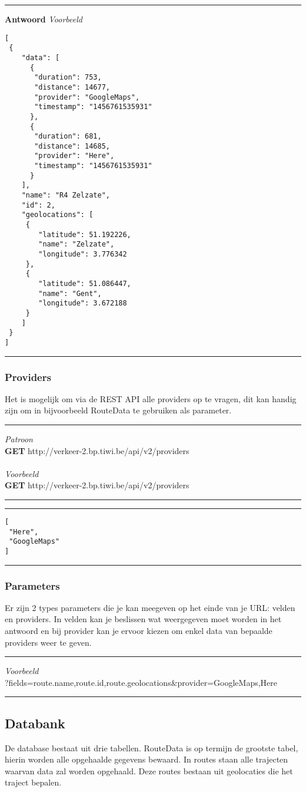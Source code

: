 \documentclass[ps,a4paper,oneside]{report}
\begin{document}
\noindent\rule[0.5ex]{\linewidth}{1pt}
\textbf{Antwoord}
\textit{Voorbeeld}
\begin{verbatim}[
 {
    "data": [
      {
       "duration": 753,
       "distance": 14677,
       "provider": "GoogleMaps",
       "timestamp": "1456761535931"
      },
      {
       "duration": 681,
       "distance": 14685,
       "provider": "Here",
       "timestamp": "1456761535931"
      }
    ],
    "name": "R4 Zelzate",
    "id": 2,
    "geolocations": [
     {
        "latitude": 51.192226,
        "name": "Zelzate",
        "longitude": 3.776342
     },
     {
        "latitude": 51.086447,
        "name": "Gent",
        "longitude": 3.672188
     }
    ]
 }
]\end{verbatim}
\noindent\rule[0.5ex]{\linewidth}{1pt}
\subsubsection{Providers}
Het is mogelijk om via de REST API alle providers op te vragen, dit kan handig zijn om in bijvoorbeeld RouteData te gebruiken als parameter.\\
\noindent\rule[0.5ex]{\linewidth}{1pt}
\textit{Patroon}\\
\textbf{GET} http://verkeer-2.bp.tiwi.be/api/v2/providers\\\\
\textit{Voorbeeld}\\
\textbf{GET} http://verkeer-2.bp.tiwi.be/api/v2/providers\\
\noindent\rule[0.5ex]{\linewidth}{1pt}
\noindent\rule[0.5ex]{\linewidth}{1pt}
\begin{verbatim}
[
 "Here",
 "GoogleMaps"
]
\end{verbatim}
\noindent\rule[0.5ex]{\linewidth}{1pt}
\subsubsection{Parameters}
Er zijn 2 types parameters die je kan meegeven op het einde van je URL: velden en providers. In velden kan je beslissen wat weergegeven moet worden in het antwoord en bij provider kan je ervoor kiezen om enkel data van bepaalde providers weer te geven.\\
\noindent\rule[0.5ex]{\linewidth}{1pt}
\textit{Voorbeeld}\\
?fields=route.name,route.id,route.geolocations\&provider=GoogleMaps,Here\\
\noindent\rule[0.5ex]{\linewidth}{1pt}
\subsection{Databank}
De database bestaat uit drie tabellen. RouteData is op termijn de grootste tabel, hierin worden alle opgehaalde gegevens bewaard. In routes staan alle trajecten waarvan data zal worden opgehaald. Deze routes bestaan uit geolocaties die het traject bepalen.
\end{document}
